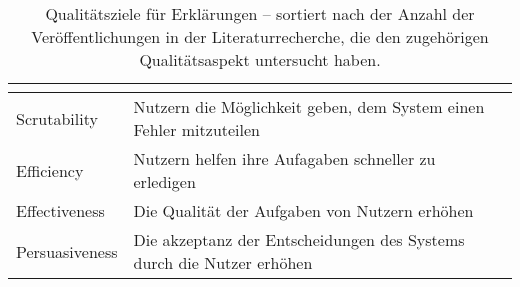 \begin{table}[htb!]
\begin{center}
\begin{tabular}{|p{}|p{}|p{}|}
                                        \cite{cheng2019explaining} \\ \hline
            Scrutability                & Nutzern die Möglichkeit geben, dem System einen Fehler mitzuteilen \cite[vgl.][]{balog_measuring_2020}
                                        & \cite{nunes_systematic_2017} \cite{chazette_knowledge_nodate} \cite{tintarev_designing_nodate} \cite{balog_measuring_2020} \cite{tintarev2015explaining} \cite{martin_developing_2019} \cite{gunning2019darpa}  \cite{tintarev2007survey} \cite{martin_evaluating_2021} \\ \hline
            Efficiency                  & Nutzern helfen ihre Aufagaben schneller zu erledigen \cite[vgl.][]{balog_measuring_2020} 
                                        & \cite{nunes_systematic_2017} \cite{chazette_knowledge_nodate} \cite{tintarev_designing_nodate} \cite{balog_measuring_2020} \cite{tsai_evaluating_2019} \cite{tintarev2015explaining} \cite{hernandez-bocanegra_effects_2020} \cite{tintarev2007survey}\\ \hline
            Effectiveness               & Die Qualität der Aufgaben von Nutzern erhöhen \cite[vgl.][]{balog_measuring_2020}
                                        & \cite{nunes_systematic_2017} \cite{chazette_knowledge_nodate} \cite{tintarev_designing_nodate} \cite{balog_measuring_2020} \cite{tintarev2015explaining} \cite{zolotas_towards_2019} \cite{hernandez-bocanegra_effects_2020} \cite{martin_evaluating_2021} \cite{rjoob_towards_2021} \cite{tintarev2007survey} \\ \hline
            Persuasiveness              & Die akzeptanz der Entscheidungen des Systems durch die Nutzer erhöhen \cite[vgl.][]{chazette_knowledge_nodate}
                                        & \cite{nunes_systematic_2017} \cite{tintarev_designing_nodate} \cite{balog_measuring_2020} \cite{sato_context_nodate} \cite{sato_context_nodate} \cite{abdulrahman_belief-based_2019} \cite{tintarev2015explaining} \cite{sato_action-triggering_2019} \cite{tintarev2007survey} \\ \hline
        \end{tabular}
    \end{center}
    \caption{Qualitätsziele für Erklärungen – sortiert nach der Anzahl der Veröffentlichungen in der Literaturrecherche, die den zugehörigen Qualitätsaspekt untersucht haben.}
    \label{tab:quality_aspects_of_explanation}
\end{table}

